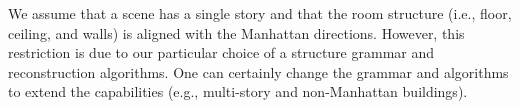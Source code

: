  We assume that a scene has a single story
and that the room structure (i.e., floor, ceiling, and walls) is aligned
with the Manhattan directions. However, this restriction is due to our
particular choice of a structure grammar and reconstruction
algorithms. One can certainly change the grammar and algorithms to
extend the capabilities (e.g., multi-story and non-Manhattan buildings).
%





